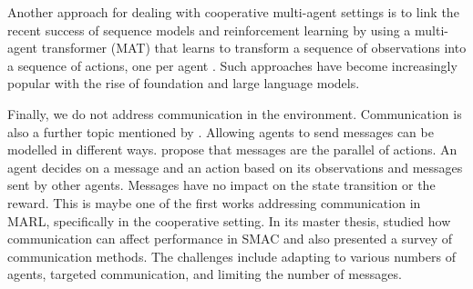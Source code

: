 Another approach for dealing with cooperative multi-agent settings is to link the recent success of sequence models and reinforcement learning by using a multi-agent transformer (MAT) that learns to transform a sequence of observations into a sequence of actions, one per agent \citep{wen2022multiagent}.
Such approaches have become increasingly popular with the rise of foundation and large language models.

Finally, we do not address communication in the environment.
Communication is also a further topic mentioned by \citep{DecPomdp}.
Allowing agents to send messages can be modelled in different ways.
\cite{foerster2016learning} propose that messages are the parallel of actions.
An agent decides on a message and an action based on its observations and messages sent by other agents.
Messages have no impact on the state transition or the reward.
This is maybe one of the first works addressing communication in MARL, specifically in the cooperative setting.
In its master thesis, \cite{fombellida2020master} studied how communication can affect performance in SMAC and also presented a survey of communication methods.
The challenges include adapting to various numbers of agents, targeted communication, and limiting the number of messages.


